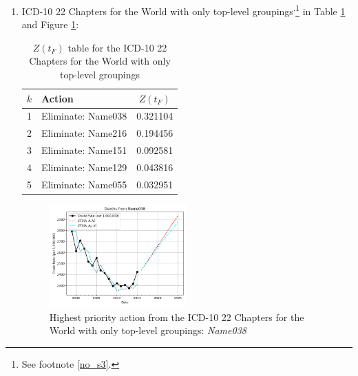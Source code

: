 \documentclass[12pt, a4paper, twocolumn]{article}
\begin{document}
\begin{enumerate}
  \vfill\eject
  \item ICD-10 22 Chapters for the World with only top-level groupings\cite{whomortality}\textsuperscript{,}\footnote{See footnote \ref{no_s3}.} in Table \ref{table:ztable10} and Figure \ref{fig:k10}:
    \begin{table}[H]
      \centering
      \begin{tabular}{clc}
        \toprule
          $k$ & Action             & $Z(t_F)$ \\
        \midrule
          1   & Eliminate: Name038 & 0.321104 \\
          2   & Eliminate: Name216 & 0.194456 \\
          3   & Eliminate: Name151 & 0.092581 \\
          4   & Eliminate: Name129 & 0.043816 \\
          5   & Eliminate: Name055 & 0.032951 \\
        \bottomrule
      \end{tabular}
      \caption{$Z(t_F)$ table for the ICD-10 22 Chapters for the World with only top-level groupings}
      \label{table:ztable10}
    \end{table}
    \begin{figure}[H]
      \centering
      \includegraphics[width=0.5\textwidth]{results/WORLD_ICD10_CHAPTER_ROOTS/Name038_ets.png}
      \caption{Highest priority action from the ICD-10 22 Chapters for the World with only top-level groupings: \textit{Name038}}\label{fig:k10}
    \end{figure}
  

\end{enumerate}
\end{document}
